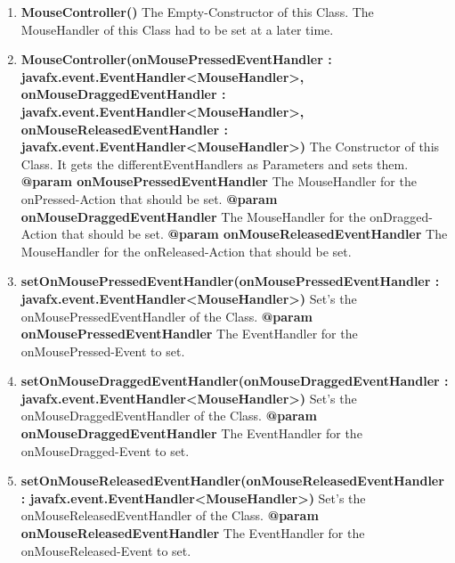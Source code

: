 \documentclass{article}
\begin{document}
				\begin{enumerate}[+]
					\item{
						\textbf{MouseController()} \newline
						The Empty-Constructor of this Class.
						The MouseHandler of this Class had to be set at a later time.
						\newline
					}
					\item{
						\textbf{MouseController(onMousePressedEventHandler : javafx.event.EventHandler<MouseHandler>, onMouseDraggedEventHandler : javafx.event.EventHandler<MouseHandler>, onMouseReleasedEventHandler : javafx.event.EventHandler<MouseHandler>)} \newline
						The Constructor of this Class.
						It gets the differentEventHandlers as Parameters and sets them.
						\newline
						\textbf{@param onMousePressedEventHandler}
							The MouseHandler for the onPressed-Action that should be set.
							\newline
						\textbf{@param onMouseDraggedEventHandler}
							The MouseHandler for the onDragged-Action that should be set.
							\newline
						\textbf{@param onMouseReleasedEventHandler}
							The MouseHandler for the onReleased-Action that should be set.
							\newline
					}
					\item{
						\textbf{setOnMousePressedEventHandler(onMousePressedEventHandler : javafx.event.EventHandler<MouseHandler>)} \newline
						Set's the onMousePressedEventHandler of the Class.
						\newline
						\textbf{@param onMousePressedEventHandler}
							The EventHandler for the onMousePressed-Event to set.
							\newline
					}
					\item{
						\textbf{setOnMouseDraggedEventHandler(onMouseDraggedEventHandler : javafx.event.EventHandler<MouseHandler>)} \newline
						Set's the onMouseDraggedEventHandler of the Class.
						\newline
						\textbf{@param onMouseDraggedEventHandler}
							The EventHandler for the onMouseDragged-Event to set.
							\newline
					}
					\item{
						\textbf{setOnMouseReleasedEventHandler(onMouseReleasedEventHandler : javafx.event.EventHandler<MouseHandler>)} \newline
						Set's the onMouseReleasedEventHandler of the Class.
						\newline
						\textbf{@param onMouseReleasedEventHandler}
							The EventHandler for the onMouseReleased-Event to set.
							\newline
					}
				\end{enumerate}
			
\end{document}
